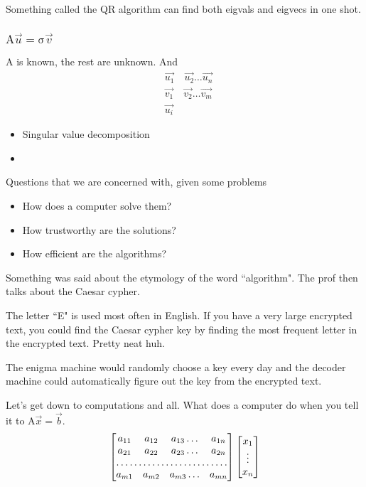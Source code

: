 \documentclass[a4paper]{article}
\begin{document}
Something called the QR algorithm can find both eigvals and eigvecs
in one shot.

\subsubsection{$\mathrm A \vec{u} = \mathrm \sigma \vec{v}$}
$\mathrm A$ is known, the rest are unknown. And
\begin{align}
	&\vec{u_1}\quad \vec{u_2}\ldots\vec{u_n} \\
	&\vec{v_1}\quad \vec{v_2} \ldots \vec{v_m} \\
	&\vec{u_i}
\end{align}
\begin{itemize}
	\item Singular value decomposition
	\item 
\end{itemize}

Questions that we are concerned with, given some problems
\begin{itemize}
	\item How does a computer solve them?
	\item How trustworthy are the solutions?
	\item How efficient are the algorithms?
\end{itemize}

Something was said about the etymology of the word ``algorithm". The
prof then talks about the Caesar cypher. 

The letter ``E" is used most often in English. If you have a very
large encrypted text, you could find the Caesar cypher key by
finding the most frequent letter in the encrypted text. Pretty neat
huh.

The enigma machine would randomly choose a key every day and the
decoder machine could automatically figure out the key from the
encrypted text.

Let's get down to computations and all. What does a computer do when
you tell it to $\mathrm{A}\vec{x} = \vec{b}$.
 \begin{equation}
	 \begin{bmatrix} a_{11} & a_{12} & a_{13} \ldots &a_{1n} \\
	 a_{21} & a_{22} & a_{23} \ldots &a_{2n}\\
	 \hdotsfor{4} \\
	 a_{m1} & a_{m2} & a_{m 3} \ldots &a_{mn}
 \end{bmatrix} 
 \begin{bmatrix} x_1\\ \vdots\\ x_n \end{bmatrix}
\end{equation}
\end{document}
